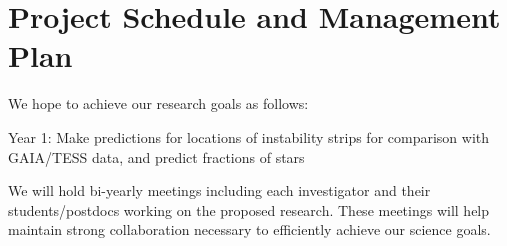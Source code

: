 \section{Project Schedule and Management Plan}

We hope to achieve our research goals as follows:

Year 1: Make predictions for locations of instability strips for comparison with GAIA/TESS data, and predict fractions of stars  

We will  hold bi-yearly meetings including each investigator and their students/postdocs working on the proposed research. These meetings will help maintain strong collaboration necessary to efficiently achieve our science goals.
